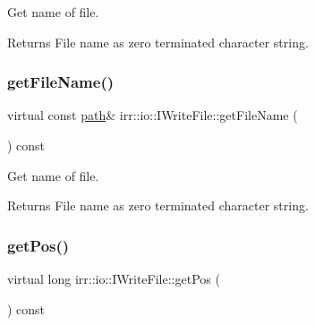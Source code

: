 Get name of file. 

\begin{DoxyReturn}{Returns}
File name as zero terminated character string. 
\end{DoxyReturn}
\mbox{\label{classirr_1_1io_1_1IWriteFile_ad129ab8feac03f06f2edf685df6a0236}} 
\subsubsection{\texorpdfstring{get\+File\+Name()}{getFileName()}\hspace{0.1cm}{\footnotesize\ttfamily [2/2]}}
{\footnotesize\ttfamily virtual const \hyperlink{namespaceirr_1_1io_a6468281622ce3a1c46b72e19f32dded5}{path}\& irr\+::io\+::\+I\+Write\+File\+::get\+File\+Name (\begin{DoxyParamCaption}{ }\end{DoxyParamCaption}) const\hspace{0.3cm}{\ttfamily [pure virtual]}}



Get name of file. 

\begin{DoxyReturn}{Returns}
File name as zero terminated character string. 
\end{DoxyReturn}
\mbox{\label{classirr_1_1io_1_1IWriteFile_a062eaf082b6f4d05cf0e44b85aa7a6ab}} 
\subsubsection{\texorpdfstring{get\+Pos()}{getPos()}\hspace{0.1cm}{\footnotesize\ttfamily [1/2]}}
{\footnotesize\ttfamily virtual long irr\+::io\+::\+I\+Write\+File\+::get\+Pos (\begin{DoxyParamCaption}{ }\end{DoxyParamCaption}) const\hspace{0.3cm}{\ttfamily [pure virtual]}}



